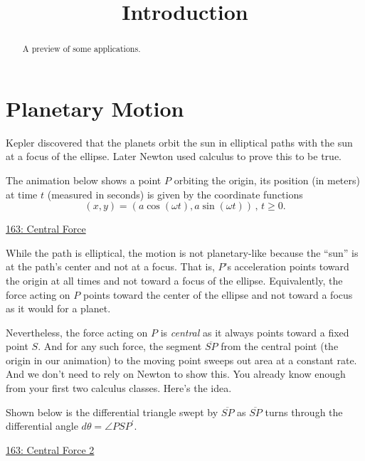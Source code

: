 \documentclass{ximera}
\title{Introduction}
\begin{document}
\begin{abstract}
A preview of some applications.
\end{abstract}
\maketitle


\section*{Planetary Motion}
Kepler discovered that the planets orbit the sun in elliptical paths with the sun at a focus of the ellipse. Later Newton used calculus to prove this to be true. 

The animation below shows a point $P$ orbiting the origin, its position (in meters) at time $t$ (measured in seconds) is given by the coordinate functions
\[
       (x,y) = (a \cos (\omega t), a \sin(\omega t)) \, , \, t \geq 0.
\]

\begin{exploration}
\begin{onlineOnly}
    \begin{center}
\end{center}
\end{onlineOnly}

\href{https://www.desmos.com/calculator/5aq0sta5aa}{163: Central Force}
\end{exploration}


While the path is elliptical, the motion is not planetary-like because the ``sun'' is at the path's center and not at a focus. That is,  $P$'s acceleration points toward the origin at all times and not toward a focus of the ellipse. Equivalently, the force acting on $P$ points toward the center of the ellipse and not toward a focus as it would for a planet. %

Nevertheless, the force acting on $P$ is \emph{central} as it always points toward a fixed point $S$. And for any such force, the segment $\overline{SP}$ from the central point (the origin in our animation) to the moving point sweeps out area at a constant rate. And we don't need to rely on Newton to show this. You already know enough from your first two calculus classes. Here's the idea.


\begin{exploration}
Shown below is the differential triangle swept by $\overline{SP}$ as $\overline{SP}$ turns through the differential angle $d\theta = \angle PSP^\prime$.
\begin{onlineOnly}
    \begin{center}
\end{center}
\end{onlineOnly}

\href{https://www.desmos.com/calculator/vtvt8znhxu}{163: Central Force 2}
\end{exploration}
\end{document}
